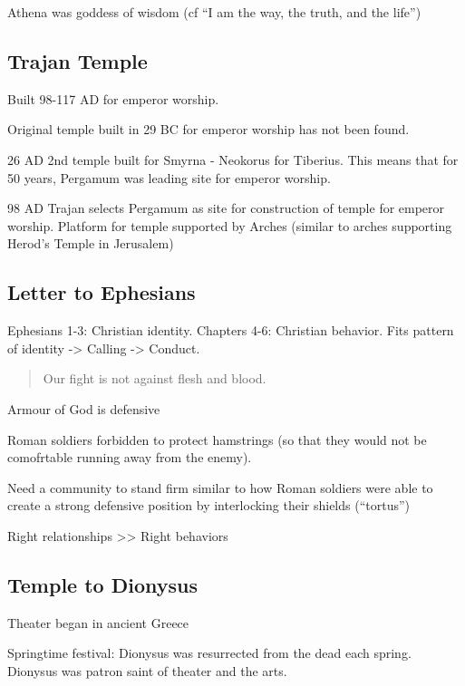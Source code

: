 \documentclass[
]{book}
\begin{document}
Athena was goddess of wisdom (cf ``I am the way, the truth, and the life'')

\hypertarget{trajan-temple}{%
\subsection{Trajan Temple}\label{trajan-temple}}

Built 98-117 AD for emperor worship.

Original temple built in 29 BC for emperor worship has not been found.

26 AD 2nd temple built for Smyrna - Neokorus for Tiberius. This means that for 50 years, Pergamum was leading site for emperor worship.

98 AD Trajan selects Pergamum as site for construction of temple for emperor worship. Platform for temple supported by Arches (similar to arches supporting Herod's Temple in Jerusalem)

\hypertarget{letter-to-ephesians}{%
\subsection{Letter to Ephesians}\label{letter-to-ephesians}}

Ephesians 1-3: Christian identity. Chapters 4-6: Christian behavior. Fits pattern of identity -\textgreater{} Calling -\textgreater{} Conduct.

\begin{quote}
Our fight is not against flesh and blood.
\end{quote}

Armour of God is defensive

Roman soldiers forbidden to protect hamstrings (so that they would not be comofrtable running away from the enemy).

Need a community to stand firm similar to how Roman soldiers were able to create a strong defensive position by interlocking their shields (``tortus'')

Right relationships \textgreater\textgreater{} Right behaviors

\hypertarget{temple-to-dionysus}{%
\subsection{Temple to Dionysus}\label{temple-to-dionysus}}

Theater began in ancient Greece

Springtime festival: Dionysus was resurrected from the dead each spring. Dionysus was patron saint of theater and the arts.
\end{document}
